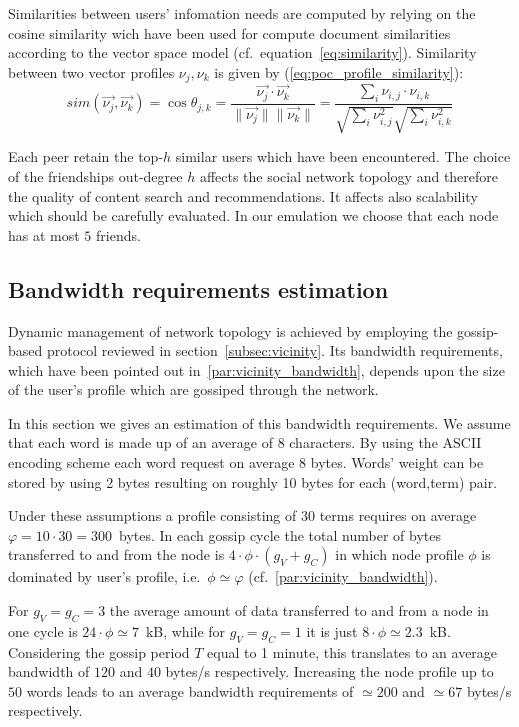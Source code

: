 Similarities between users' infomation needs are computed by relying on the cosine similarity wich have been used for compute document similarities according to the vector space model (cf.\ equation~\ref{eq:similarity}). Similarity between two vector profiles $\nu_j, \nu_k$ is given by (\ref{eq:poc_profile_similarity}):
\begin{equation}
 sim(\vec{\nu_j},\vec{\nu_k}) = \cos \theta_{j,k} = \frac{\vec{\nu_j} \cdot \vec{\nu_k}}{\|\vec{\nu_j}\| \|\vec{\nu_k}\|} = \frac{\sum_i \nu_{i,j} \cdot \nu_{i,k}}{\sqrt{\sum_i \nu_{i,j}^2 } \sqrt{\sum_i \nu_{i,k}^2 }  }
\label{eq:poc_profile_similarity}
\end{equation}

Each peer retain the top-$h$ similar users which have been encountered. The choice of the friendships out-degree $h$ affects the social network topology and therefore the quality of content search and recommendations. It affects also scalability which should be carefully evaluated. In our emulation we choose that each node has at most $5$ friends.



\subsection{Bandwidth requirements estimation}
Dynamic management of network topology is achieved by employing the gossip-based protocol reviewed in section~\ref{subsec:vicinity}. Its bandwidth requirements, which have been pointed out in~\ref{par:vicinity_bandwidth}, depends upon the size of the user's profile which are gossiped through the network.

In this section we gives an estimation of this bandwidth requirements. We assume that each word is made up of an average of $8$ characters. By using the ASCII encoding scheme each word request on average 8 bytes. Words' weight can be stored by using 2 bytes resulting on roughly 10 bytes for each (word,term) pair.

Under these assumptions a profile consisting of $30$ terms requires on average $\varphi = 10 \cdot 30 = 300$~bytes. In each gossip cycle the total number of bytes transferred to and from the node is $4 \cdot \phi \cdot (g_V+g_C)$ in which node profile $\phi$ is dominated by user's profile, i.e.\ $\phi \simeq \varphi$ (cf.\ \ref{par:vicinity_bandwidth}).

For $g_V=g_C=3$ the average amount of data transferred to and from a node in one cycle is $24 \cdot \phi \simeq 7$~kB, while for $g_V=g_C=1$ it is just $8 \cdot \phi \simeq 2.3$~kB. Considering the gossip period $T$ equal to 1 minute, this translates to an average bandwidth of $120$ and $40$ bytes/s respectively. Increasing the node profile up to $50$ words leads to an average bandwidth requirements of $\simeq 200$ and $\simeq 67$ bytes/s respectively.

